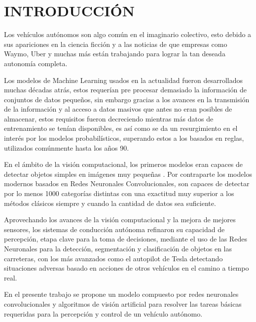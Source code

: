 \section{INTRODUCCIÓN}
Los vehículos autónomos son algo común en el imaginario colectivo, esto debido a sus apariciones en la ciencia ficción y a las noticias de que empresas como Waymo, Uber y muchas más están trabajando para lograr la tan deseada autonomía completa.

Los modelos de Machine Learning usados en la actualidad fueron desarrollados muchas décadas atrás, estos requerían pre procesar demasiado la información de conjuntos de datos pequeños, sin embargo gracias a los avances en la transmisión de la información y al acceso a datos masivos que antes no eran posibles de almacenar, estos requisitos fueron decreciendo mientras más datos de entrenamiento se tenían disponibles, es así como se da un resurgimiento en el interés por los modelos probabilísticos, superando estos a los basados en reglas, utilizados comúnmente hasta los años 90. \citep{Goodfellow-et-al-2016}

En el ámbito de la visión computacional, los primeros modelos eran capaces de detectar objetos simples en imágenes muy pequeñas \citep{Rumelhart_Hinton_Williams_1986}. Por contraparte los modelos modernos basados en Redes Neuronales Convolucionales, son capaces de detectar por lo menos 1000 categorías distintas con una exactitud muy superior a los métodos clásicos siempre y cuando la cantidad de datos sea suficiente. \citep{alexnet}

Aprovechando los avances de la visión computacional y la mejora de mejores sensores, los sistemas de conducción autónoma refinaron su capacidad de percepción, etapa clave para la toma de decisiones, mediante el uso de las Redes Neuronales para la detección, segmentación y clasificación de objetos en las carreteras, con los más avanzados como el autopilot de Tesla detectando situaciones adversas basado en acciones de otros vehículos en el camino a tiempo real. \citep{karpathy-scaledml}

En el presente trabajo se propone un modelo compuesto por redes neuronales convolucionales y algoritmos de visión artificial para resolver las tareas básicas requeridas para la percepción y control de un vehículo autónomo.
\newpage